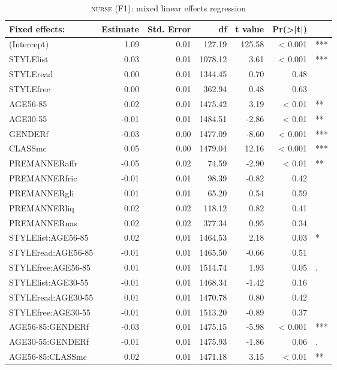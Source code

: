 \newpage 
{
	\footnotesize
	\begin{longtable}[c]{p{}rrrrrl}
		\caption{\textsc{nurse} (F1): mixed linear effects regression}\label{tab.regression.nurse.f1}\\
		\lsptoprule
		Fixed effects: & Estimate & Std. Error & df & t value & Pr(>|t|) & \\ 
		\midrule{}
		(Intercept) & 1.09 & 0.01 & 127.19 & 125.58 & < 0.001 & *** \\ 
		STYLElist & 0.03 & 0.01 & 1078.12 & 3.61 & < 0.001 & *** \\ 
		STYLEread & 0.00 & 0.01 & 1344.45 & 0.70 & 0.48 & \\ 
		STYLEfree & 0.00 & 0.01 & 362.94 & 0.48 & 0.63 & \\ 
		AGE56-85 & 0.02 & 0.01 & 1475.42 & 3.19 & < 0.01 & ** \\ 
		AGE30-55 & -0.01 & 0.01 & 1484.51 & -2.86 & < 0.01 & ** \\ 
		GENDERf & -0.03 & 0.00 & 1477.09 & -8.60 & < 0.001 & *** \\ 
		CLASSmc & 0.05 & 0.00 & 1479.04 & 12.16 & < 0.001 & *** \\ 
		PREMANNERaffr & -0.05 & 0.02 & 74.59 & -2.90 & < 0.01 & ** \\ 
		PREMANNERfric & -0.01 & 0.01 & 98.39 & -0.82 & 0.42 & \\ 
		PREMANNERgli & 0.01 & 0.01 & 65.20 & 0.54 & 0.59 & \\ 
		PREMANNERliq & 0.02 & 0.02 & 118.12 & 0.82 & 0.41 & \\ 
		PREMANNERnas & 0.02 & 0.02 & 377.34 & 0.95 & 0.34 & \\ 
		STYLElist:AGE56-85 & 0.02 & 0.01 & 1464.53 & 2.18 & 0.03 & * \\ 
		STYLEread:AGE56-85 & -0.01 & 0.01 & 1465.50 & -0.66 & 0.51 & \\ 
		STYLEfree:AGE56-85 & 0.01 & 0.01 & 1514.74 & 1.93 & 0.05 & .\\ 
		STYLElist:AGE30-55 & -0.01 & 0.01 & 1468.34 & -1.42 & 0.16 & \\ 
		STYLEread:AGE30-55 & 0.01 & 0.01 & 1470.78 & 0.80 & 0.42 & \\ 
		STYLEfree:AGE30-55 & -0.01 & 0.01 & 1513.20 & -0.89 & 0.37 & \\ 
		AGE56-85:GENDERf & -0.03 & 0.01 & 1475.15 & -5.98 & < 0.001 & *** \\ 
		AGE30-55:GENDERf & -0.01 & 0.01 & 1475.93 & -1.86 & 0.06 & .\\ 
		AGE56-85:CLASSmc & 0.02 & 0.01 & 1471.18 & 3.15 & < 0.01 & ** \\ 

\end{longtable}}
